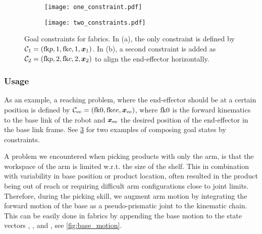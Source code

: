 \begin{figure}[b]
  \centering
  \begin{subfigure}[b]{0.5\linewidth}
    \centering
    \texttt{[image: one\_constraint.pdf]}
    \caption{}
    \label{subfig:one_goal_constraint}
  \end{subfigure}%
  \begin{subfigure}[b]{0.5\linewidth}
    \centering
    \texttt{[image: two\_constraints.pdf]}
    \caption{}
    \label{subfig:two_goal_constraints}
  \end{subfigure}
  \caption{Goal constraints for \ac{fabrics}. In (a), 
  the only constraint is defined by $\mathcal{C}_1 = (\textrm{fk}{p,1},
  \textrm{fk}{c,1}, \bm{x}_1)$.
  In (b), a second constraint is added as
   $\mathcal{C}_2 = (\textrm{fk}{p,2}, \textrm{fk}{c,2}, \bm{x}_2)$ to align the
   end-effector horizontally.}
  \label{fig:goal_constraints}
\end{figure}

\subsubsection{Usage} As an example, a reaching problem, where the
end-effector should be at a certain position is defined by
$\mathcal{C}_{\textrm{ee}} = (\textrm{fk}{0},\textrm{fk}{ee},\bm{x}_\textrm{ee})$,
where $\textrm{fk}{0}$ is the forward kinematics to the base link of
the robot and $\bm{x}_\textrm{ee}$ the desired position of the
end-effector in the base link frame. See \cref{fig:goal_constraints} for two examples of composing goal states by constraints.

A problem we encountered when picking products with only the arm, is that the workspace of the arm is limited w.r.t. the size of the shelf. This in combination with variability in base position or product location, often resulted in the product being out of reach or requiring difficult arm configurations close to joint limits.
Therefore, during the picking skill, we augment arm motion by integrating the forward motion of the base as a pseudo-prismatic joint to the kinematic chain. This can be easily done in \ac{fabrics} by appending the base motion to the state vectors \q{}, \qdot{}, and \qddot{}, see \cref{fig:base_motion}. 


